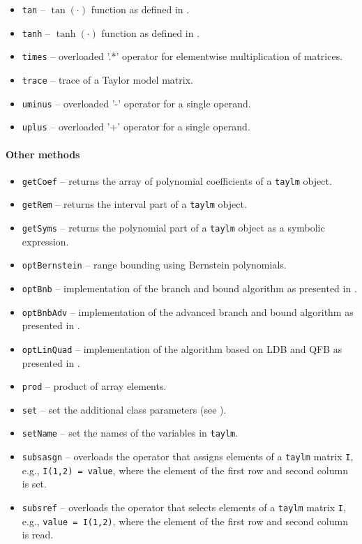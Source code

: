 \begin{itemize}
    \item \texttt{tan} -- $\tan(\cdot)$ function as defined in \cite[Eq.~(26)]{Althoff2018b}.
    \item \texttt{tanh} -- $\tanh(\cdot)$ function as defined in \cite[Eq.~(29)]{Althoff2018b}.
    \item \texttt{times} -- overloaded '.*' operator for elementwise multiplication of matrices.
    \item \texttt{trace} -- trace of a Taylor model matrix.
    \item \texttt{uminus} -- overloaded '-' operator for a single operand.
    \item \texttt{uplus} -- overloaded '+' operator for a single operand.
\end{itemize}

\paragraph{Other methods}

\begin{itemize}
    \item \texttt{getCoef} -- returns the array of polynomial coefficients of a \texttt{taylm} object.
    \item \texttt{getRem} -- returns the interval part of a \texttt{taylm} object.
    \item \texttt{getSyms} -- returns the polynomial part of a \texttt{taylm} object as a symbolic expression.
    \item \texttt{optBernstein} -- range bounding using Bernstein polynomials.
    \item \texttt{optBnb} -- implementation of the branch and bound algorithm as presented in \cite[Sec.~2.3.2]{Althoff2018b}.
    \item \texttt{optBnbAdv} -- implementation of the advanced branch and bound algorithm as presented in \cite[Sec.~2.3.2]{Althoff2018b}.
    \item \texttt{optLinQuad} -- implementation of the algorithm based on LDB and QFB as presented in \cite[Sec.~2.3.3]{Althoff2018b}.
    \item \texttt{prod} -- product of array elements.
    \item \texttt{set} -- set the additional class parameters (see \cite[Sec.~4.3]{Althoff2018b}).
    \item \texttt{setName} -- set the names of the variables in \texttt{taylm}.
    \item \texttt{subsasgn} -- overloads the operator that assigns elements of a \texttt{taylm} matrix \texttt{I}, e.g., \texttt{I(1,2) = value}, where the element of the first row and second column is set.
    \item \texttt{subsref} -- overloads the operator that selects elements of a \texttt{taylm} matrix \texttt{I}, e.g., \texttt{value = I(1,2)}, where the element of the first row and second column is read.
\end{itemize}

